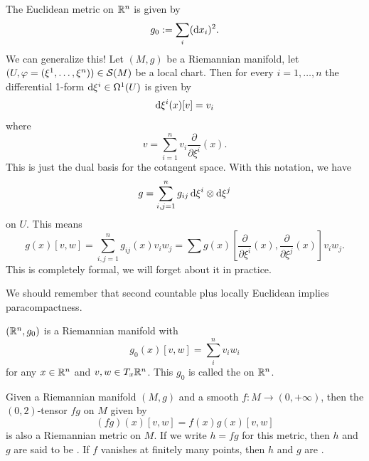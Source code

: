 \begin{remark}
The Euclidean metric on $\mathbb{R}^{n}$ is given by
\begin{equation}
g_{0}:=\sum_{i}(\mathrm{d} x_{i})^{2}.
\end{equation}
We can generalize this! Let $(M,g)$ be a Riemannian manifold, let
$(U,\varphi=(\xi^{1},\dots,\xi^{n}))\in\mathcal{S}(M)$ be a local
chart. Then for every $i=1,\dots,n$ the differential 1-form
$\mathrm{d}\xi^{i}\in\Omega^{1}(U)$ is given by
\begin{equation}
\mathrm{d}\xi^{i}(x)[v]=v_{i}
\end{equation}
where
\begin{equation}
v=\sum^{n}_{i=1}v_{i}\frac{\partial}{\partial\xi^{i}}(x).
\end{equation}
This is just the dual basis for the cotangent space. With this
notation, we have
\begin{equation}
g=\sum^{n}_{i,j=1}g_{ij}\,\mathrm{d}\xi^{i}\otimes\mathrm{d}\xi^{j}
\end{equation}
on $U$. This means
\begin{equation}
g(x)[v,w]=\sum^{n}_{i,j=1}g_{ij}(x)v_{i}w_{j}=\sum g(x)[\frac{\partial}{\partial\xi^{i}}(x),\frac{\partial}{\partial\xi^{j}}(x)]v_{i}w_{j}.
\end{equation}
This is completely formal, we will forget about it in practice.
\end{remark}

\begin{remark}
We should remember that second countable plus locally Euclidean
implies paracompactness.
\end{remark}

\begin{example}
$(\mathbb{R}^{n},g_{0})$ is a Riemannian manifold with
\begin{equation}
g_{0}(x)[v,w]=\sum^{n}_{i}v_{i}w_{i}
\end{equation}
for any $x\in\mathbb{R}^{n}$ and $v,w\in T_{x}\mathbb{R}^{n}$. This $g_{0}$ is
called the  on $\mathbb{R}^{n}$.
\end{example}

\begin{example}
Given a Riemannian manifold $(M,g)$ and a smooth $f\colon M\to(0,+\infty)$,
then the $(0,2)$-tensor $fg$ on $M$ given by
\begin{equation}
(fg)(x)[v,w]=f(x)g(x)[v,w]
\end{equation}
is also a Riemannian metric on $M$. If we write $h=fg$ for this
metric, then $h$ and $g$ are said to be .
If $f$ vanishes at finitely many points, then $h$ and $g$ are
.
\end{example}

